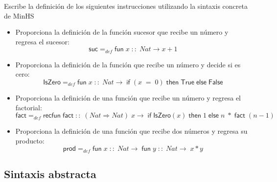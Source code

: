     \begin{exercise}
    Escribe la definición de los siguientes instrucciones utilizando la sintaxis concreta de \textsf{MinHS}\\

	\begin{itemize}
		\item Proporciona la definición de la función sucesor que recibe un número y regresa el sucesor: 
			$$ \textsf{suc} =_{def} \textsf{fun}\; x\;::\; \textit{Nat} \rightarrow x + 1$$
		\item Proporciona la definición de la función que recibe un número y decide si es cero:
			 $$ \textsf{IsZero} =_{def} \textsf{fun}\; x\;::\; \textit{Nat} \rightarrow\; \textsf{if}\; (x\; =\; 0) \; \textsf{then}\; \textsf{True}\; \textsf{else}\; \textsf{False}$$
		\item Proporciona la definición de una función que recibe un número y regresa el factorial:
			 $$ \textsf{fact} =_{def} \textsf{recfun}\; \textsf{fact}\; ::\; (\textit{Nat} \Rightarrow \textit{Nat})\; x \rightarrow\; \textsf{if}\; \textsf{IsZero}(x)\; \textsf{then}\; 1\; \textsf{else}\; n\; *\; \textsf{fact}\; (n-1)$$
		\item Proporciona la definición de una función que recibe dos números y regresa su producto:
			$$ \textsf{prod} =_{def} \textsf{fun}\; x\; ::\; Nat \rightarrow\; \textsf{fun}\; y\; ::\; Nat \rightarrow\; x*y$$
	\end{itemize}

    \end{exercise}

\subsection{Sintaxis abstracta}

